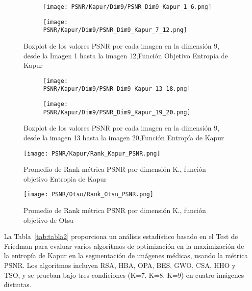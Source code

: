 \documentclass[conference]{IEEEtran}
\begin{document}
\begin{figure}[htbp]
	\centering
	
	\begin{subfigure}{0.5\textwidth}
		\texttt{[image: PSNR/Kapur/Dim9/PSNR\_Dim9\_Kapur\_1\_6.png]}
	\end{subfigure}
	
	\begin{subfigure}{0.5\textwidth}
		\texttt{[image: PSNR/Kapur/Dim9/PSNR\_Dim9\_Kapur\_7\_12.png]}
	\end{subfigure}
	\caption{Boxplot de los valores PSNR por cada imagen en la dimensión 9, desde la Imagen 1 hasta la imagen 12,Función Objetivo Entropia de Kapur}
	\label{fig:imagenes}    
\end{figure}

\begin{figure}
	\centering
	\begin{subfigure}{0.5\textwidth}
		\texttt{[image: PSNR/Kapur/Dim9/PSNR\_Dim9\_Kapur\_13\_18.png]}
	\end{subfigure}   
	\begin{subfigure}{0.5\textwidth}
		\texttt{[image: PSNR/Kapur/Dim9/PSNR\_Dim9\_Kapur\_19\_20.png]}
		\vspace{-150pt} %
	\end{subfigure}
	\caption{Boxplot de los valores PSNR por cada imagen en la dimensión 9, desde la imagen 13 hasta la imagen 20,Función Entropía de Kapur}
	\label{fig:imagenes}    
\end{figure}



\begin{figure}[htbp]
    \centering
    \texttt{[image: PSNR/Kapur/Rank\_Kapur\_PSNR.png]}
    \caption{Promedio de Rank métrica PSNR por dimensión K., función objetivo Entropia de Kapur}
    \label{fig:fig511}
\end{figure}

\begin{figure}[htbp]
	\centering
	\texttt{[image: PSNR/Otsu/Rank\_Otsu\_PSNR.png]}
		\caption{Promedio de Rank métrica PSNR por dimensión K., función objetivo de Otsu}
\end{figure}



\noindent La Tabla~\ref{tab:tabla2} proporciona un análisis estadístico basado en el Test de Friedman para evaluar varios algoritmos de optimización en la maximización de la entropía de Kapur en la segmentación de imágenes médicas, usando la métrica PSNR. Los algoritmos incluyen RSA, HBA, OPA, BES, GWO, CSA, HHO y TSO, y se prueban bajo tres condiciones (K=7, K=8, K=9) en cuatro imágenes distintas.
\end{document}

